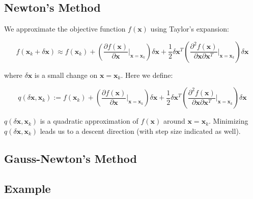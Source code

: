 \subsection{Newton's Method}
We approximate the objective function $f(\textbf{x})$ using Taylor's expansion:

\begin{equation}
    f(\textbf{x}_k+\delta \textbf{x}) \approx f(\textbf{x}_k) + 
    (\frac{\partial f(\textbf{x})}{\partial \textbf{x}} |_{\textbf{x}=\textbf{x}_k})
    \delta \textbf{x} +
    \frac{1}{2}\delta \textbf{x}^T (\frac{\partial^2 f(\textbf{x})}
    {\partial \textbf{x} \partial \textbf{x}^T}|_{\textbf{x}=\textbf{x}_k})
    \delta \textbf{x}
    \label{newton}
\end{equation}

where $\delta \textbf{x}$ is a small change on $\textbf{x} = \textbf{x}_k$. Here we define:

\begin{equation}
    q(\delta \textbf{x}, \textbf{x}_k) := 
    f(\textbf{x}_k) + 
    (\frac{\partial f(\textbf{x})}{\partial \textbf{x}} |_{\textbf{x}=\textbf{x}_k})
    \delta \textbf{x} +
    \frac{1}{2}\delta \textbf{x}^T (\frac{\partial^2 f(\textbf{x})}
    {\partial \textbf{x} \partial \textbf{x}^T}|_{\textbf{x}=\textbf{x}_k})
    \delta \textbf{x}
    \label{q}
\end{equation}

$q(\delta \textbf{x}, \textbf{x}_k)$ is a quadratic approximation of $f(\textbf{x})$
around $\textbf{x} = \textbf{x}_k$. Minimizing $q(\delta \textbf{x}, \textbf{x}_k)$
leads us to a descent direction (with step size indicated as well).




\subsection{Gauss-Newton's Method}

\subsection{Example}

